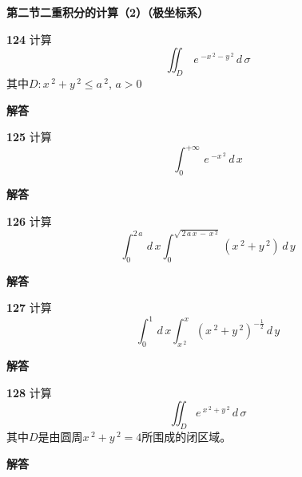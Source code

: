 \documentclass[a4paper,10pt]{article} %
\begin{document}

\textheight


\newpage
\par\noindent \textbf{第二节\quad 二重积分的计算（2）（极坐标系）} 
\par\noindent \textbf{124} \quad 计算
$$ \iint_D \,e\,^{-x\,^2-y\,^2}\,d\,\sigma$$
其中$D: x\,^2+y\,^2\leq a\,^2$, $a>0$
\par\noindent \textbf{ 解答}




\textheight


\par\noindent \textbf{125} \quad 计算
$$ \int_0^{+\infty} \,e\,^{-x\,^2}\,d\,x$$
\par\noindent \textbf{ 解答}




\textheight


\par\noindent \textbf{126} \quad 计算
$$ \int_0^{2\,a}\,d\,x \int_0^{\sqrt{\,2\,a\,x\,-\,x\,^2}} \left(x\,^2+y\,^2\right)\,d\,y$$
\par\noindent \textbf{ 解答}




\textheight


\par\noindent \textbf{127} \quad 计算
$$ \int_0^1\,d\,x \int_{x\,^2}^x \left(x\,^2+y\,^2\right)^{-\frac{1}{2}}\,d\,y$$
\par\noindent \textbf{ 解答}




\textheight


\par\noindent \textbf{128} \quad 计算
$$ \iint_D e\,^{x\,^2+y\,^2}\,d\,\sigma$$
其中$D$是由圆周$x\,^2+y\,^2=4$所围成的闭区域。
\par\noindent \textbf{ 解答}
\end{document}
